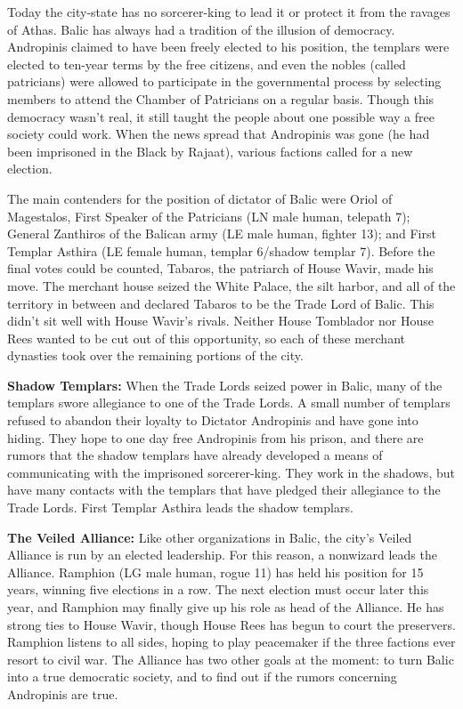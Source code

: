 {
	Today the city-state has no sorcerer-king to lead it or protect it from the ravages of Athas. Balic has always had a tradition of the illusion of democracy. Andropinis claimed to have been freely elected to his position, the templars were elected to ten-year terms by the free citizens, and even the nobles (called patricians) were allowed to participate in the governmental process by selecting members to attend the Chamber of Patricians on a regular basis. Though this democracy wasn't real, it still taught the people about one possible way a free society could work. When the news spread that Andropinis was gone (he had been imprisoned in the Black by Rajaat), various factions called for a new election.

	The main contenders for the position of dictator of Balic were Oriol of Magestalos, First Speaker of the Patricians (LN male human, telepath 7); General Zanthiros of the Balican army (LE male human, fighter 13); and First Templar Asthira (LE female human, templar 6/shadow templar 7). Before the final votes could be counted, Tabaros, the patriarch of House Wavir, made his move. The merchant house seized the White Palace, the silt harbor, and all of the territory in between and declared Tabaros to be the Trade Lord of Balic. This didn't sit well with House Wavir's rivals. Neither House Tomblador nor House Rees wanted to be cut out of this opportunity, so each of these merchant dynasties took over the remaining portions of the city.

	\textbf{Shadow Templars:} When the Trade Lords seized power in Balic, many of the templars swore allegiance to one of the Trade Lords. A small number of templars refused to abandon their loyalty to Dictator Andropinis and have gone into hiding. They hope to one day free Andropinis from his prison, and there are rumors that the shadow templars have already developed a means of communicating with the imprisoned sorcerer-king. They work in the shadows, but have many contacts with the templars that have pledged their allegiance to the Trade Lords. First Templar Asthira leads the shadow templars.

	\textbf{The Veiled Alliance:} Like other organizations in Balic, the city's Veiled Alliance is run by an elected leadership. For this reason, a nonwizard leads the Alliance. Ramphion (LG male human, rogue 11) has held his position for 15 years, winning five elections in a row. The next election must occur later this year, and Ramphion may finally give up his role as head of the Alliance. He has strong ties to House Wavir, though House Rees has begun to court the preservers. Ramphion listens to all sides, hoping to play peacemaker if the three factions ever resort to civil war. The Alliance has two other goals at the moment: to turn Balic into a true democratic society, and to find out if the rumors concerning Andropinis are true.
}
